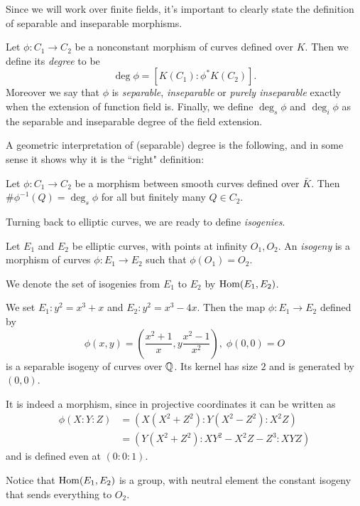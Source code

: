 Since we will work over finite fields, it's important to clearly state the definition of separable and inseparable morphisms.

\begin{definition}
    Let $\phi:C_1\to C_2$ be a nonconstant morphism of curves defined over $K$. Then we define its \emph{degree} to be $$\deg\phi = [K(C_1):\phi^\ast K(C_2)].$$
    Moreover we say that $\phi$ is \emph{separable}, \emph{inseparable} or \emph{purely inseparable} exactly when the extension of function field is. Finally, we define $\deg_s\phi$ and $\deg_i\phi$ as the separable and inseparable degree of the field extension.
\end{definition}

A geometric interpretation of (separable) degree is the following, and in some sense it shows why it is the ``right" definition:

\begin{proposition}
    Let $\phi: C_1\to C_2$ be a morphism between smooth curves defined over $\bar K$. Then $\#\phi^{-1}(Q)=\deg_s\phi$ for all but finitely many $Q\in C_2$.
\end{proposition}

Turning back to elliptic curves, we are ready to define \emph{isogenies}.
\begin{definition}
    Let $E_1$ and $E_2$ be elliptic curves, with points at infinity $O_1,O_2$. An \emph{isogeny} is a morphism of curves $\phi:E_1\to E_2$ such that $\phi(O_1)=O_2$.
    
    We denote the set of isogenies from $E_1$ to $E_2$ by $\operatorname{Hom}(E_1, E_2)$.
\end{definition}

\begin{example}
    We set $E_1:y^2=x^3+x$ and $E_2:y^2=x^3-4x$. Then the map $\phi:E_1\to E_2$ defined by $$\phi(x,y)=\left(\frac{x^2+1}{x}, y\frac{x^2-1}{x^2}\right), \;\phi(0,0)=O$$ is a separable isogeny of curves over $\mathbb{Q}$. Its kernel has size $2$ and is generated by $(0,0)$.
    
    It is indeed a morphism, since in projective coordinates it can be written as
    \begin{align*}
    \phi(X:Y:Z) &= (X(X^2+Z^2):Y(X^2-Z^2):X^2Z)\\
    &= (Y(X^2+Z^2):XY^2-X^2Z-Z^3:XYZ)
    \end{align*}
    and is defined even at $(0:0:1)$.
\end{example}

Notice that $\operatorname{Hom}(E_1, E_2)$ is a group, with neutral element the constant isogeny that sends everything to $O_2$.

